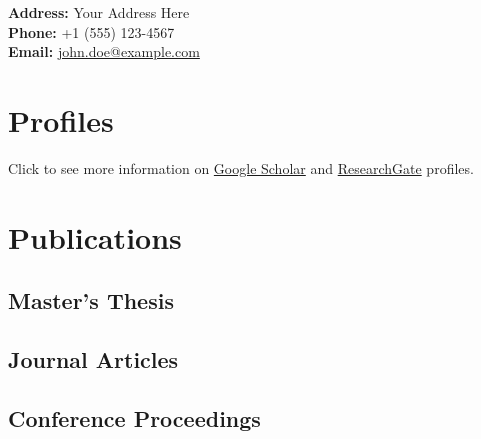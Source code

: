 \documentclass[a4paper,12pt]{article} %
\begin{document}

\vspace{12pt}

\noindent \textbf{Address:} Your Address Here\\
\noindent \textbf{Phone:} +1 (555) 123-4567\\
\noindent \textbf{Email:} \href{mailto:john.doe@example.com}{john.doe@example.com}

\section*{Profiles}
Click to see more information on \href{https://scholar.google.com/citations?user=5hyZ0wsAAAAJhl\&user=5hyZ0wsAAAAJ}{Google Scholar} and \href{https://www.researchgate.net/profile/Bekir-Bakar}{ResearchGate} profiles.

\section*{Publications}
\subsection*{Master's Thesis}
\begin{refsection}
    \nocite{bakar2018mastertshesis}
    \printbibliography[type=thesis,heading=none]
\end{refsection}

\subsection*{Journal Articles}
\begin{refsection}
    \nocite{yayik2022deep}
    \printbibliography[type=article,heading=none]
\end{refsection}

\subsection*{Conference Proceedings}
\begin{refsection}
    \nocite{bakar2020turkish, bakar2018experimental, bakar2018replay}
    \printbibliography[type=inproceedings,heading=none]
\end{refsection}
\end{document}
